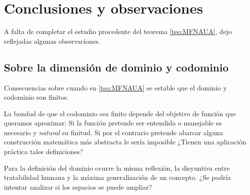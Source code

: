 %

\section{Conclusiones y observaciones} 

A falta de completar el estudio procedente del teorema \ref{teo:MFNAUA}, 
dejo reflejadas algunas observaciones. 

\subsection{Sobre la dimensión de dominio y codominio} 

Consecuencias sobre cuando en \ref{teo:MFNAUA} se estable que el dominio y codominio son finitos. 

La bondad de que el codominio sea finito depende del objetivo de función que queramos aproximar: 
Si la función pretende ser entendida o manejable es necesario y \textit{natural} su finitud. 
Si por el contrario pretende abarcar alguna 
construcción matemática más abstracta le sería imposible ¿Tienen una aplicación práctica tales definiciones?

Para la definición del dominio ocurre la misma reflexión, la disyuntiva entre tratabilidad humana y la máxima generalización de un concepto. 
¿Se podría intentar analizar si los espacios se puede ampliar?  
